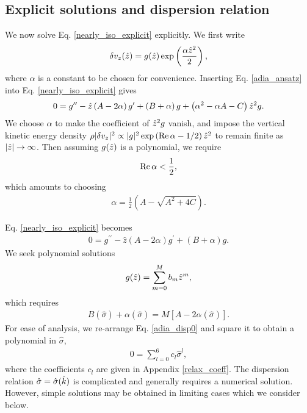 \subsection{Explicit solutions and dispersion relation}\label{disp_relax}
We now solve Eq. \ref{nearly_iso_explicit} explicitly. We first write  
\begin{align}
  \delta v_z(\hat{z}) =
  g(\hat{z})\exp\left(\frac{\alpha\hat{z}^2}{2}\right), \label{adia_ansatz}
\end{align}
where $\alpha$ is a constant to be chosen for convenience. Inserting
Eq. \ref{adia_ansatz} into Eq. \ref{nearly_iso_explicit} gives
\begin{align}
  0 = g^{\prime\prime} - \hat{z}\left(A - 2\alpha\right)g^\prime + \left(B +
    \alpha\right)g
  +\left(\alpha^2 - \alpha A - C\right)\hat{z}^2 g.
\end{align}
We choose $\alpha$ to make the coefficient of $\hat{z}^2g$
vanish, and impose the vertical kinetic energy density
$\rho|\delta v_z|^2\propto |g|^2 \exp{\left(\operatorname{Re}\alpha -
    1/2\right)\hat{z}^2}$ to remain finite as $|\hat{z}|\to\infty$. 
Then assuming $g(\hat{z})$ is a polynomial, we require  
\begin{align}
  \operatorname{Re}\alpha < \frac{1}{2}, 
\end{align}
which amounts to choosing 
\begin{align}
  \alpha = \frac{1}{2}\left(A - \sqrt{A^2 + 4C}\right).  
\end{align} 

Eq. \ref{nearly_iso_explicit} becomes 
\begin{align}
  0 = g^{\prime\prime} - \hat{z}\left(A - 2\alpha\right)g^\prime +
  \left(B + \alpha\right)g.
\end{align}
We seek polynomial solutions 
\begin{align}
  g(\hat{z}) = \sum_{m=0}^M b_m \hat{z}^m,
\end{align}
which requires
\begin{align}
  B(\hat{\sigma}) + \alpha(\hat{\sigma}) =
  M\left[A-2\alpha(\hat{\sigma})\right].\label{adia_disp0} 
\end{align}
For ease of analysis, we re-arrange Eq. \ref{adia_disp0} and square it
to obtain a polynomial in $\hat{\sigma}$,  
\begin{align}
  0 = \sum_{l=0}^{6}c_l\hat{\sigma}^l,\label{relax_disp}
\end{align}
where the coefficients $c_l$ are given in Appendix \ref{relax_coeff}.
The dispersion relation $\hat{\sigma}=\hat{\sigma}(\hat{k})$ is
complicated and generally requires a numerical solution. However,
simple solutions may be obtained in limiting cases which we consider
below.  

